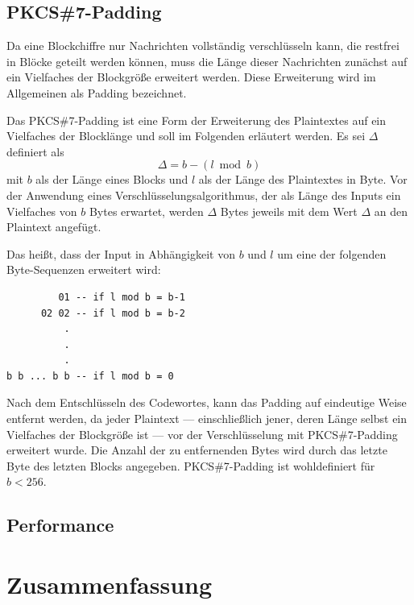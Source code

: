 \documentclass[course=erap]{aspdoc}
\begin{document}
\subsection{PKCS\#7-Padding}

Da eine Blockchiffre nur Nachrichten vollständig verschlüsseln kann, die restfrei in Blöcke geteilt werden können, muss die Länge dieser Nachrichten zunächst auf ein Vielfaches der Blockgröße erweitert werden. Diese Erweiterung wird im Allgemeinen als Padding bezeichnet.\bigbreak

Das PKCS\#7-Padding ist eine Form der Erweiterung des Plaintextes auf ein Vielfaches der Blocklänge und soll im Folgenden erläutert werden. Es sei $\Delta$ definiert als
\[
    \Delta = b - (l \bmod b)
\]
mit $b$ als der Länge eines Blocks und $l$ als der Länge des Plaintextes in Byte. Vor der Anwendung eines Verschlüsselungsalgorithmus, der als Länge des Inputs ein Vielfaches von $b$ Bytes erwartet, werden $\Delta$ Bytes jeweils mit dem Wert $\Delta$ an den Plaintext angefügt.\cite[p.28]{rfc5652}\bigbreak

Das heißt, dass der Input in Abhängigkeit von $b$ und $l$ um eine der folgenden Byte-Sequenzen erweitert wird:

\begin{samepage}
\begin{verbatim}
         01 -- if l mod b = b-1
      02 02 -- if l mod b = b-2
          .
          .
          .
b b ... b b -- if l mod b = 0
\end{verbatim}
\end{samepage}

Nach dem Entschlüsseln des Codewortes, kann das Padding auf eindeutige Weise entfernt werden, da jeder Plaintext --- einschließlich jener, deren Länge selbst ein Vielfaches der Blockgröße ist --- vor der Verschlüsselung mit PKCS\#7-Padding erweitert wurde. Die Anzahl der zu entfernenden Bytes wird durch das letzte Byte des letzten Blocks angegeben. PKCS\#7-Padding ist wohldefiniert für $b < 256$.\cite[p.28]{rfc5652}

\subsection{Performance}

\section{Zusammenfassung}

\printbibliography
\end{document}
